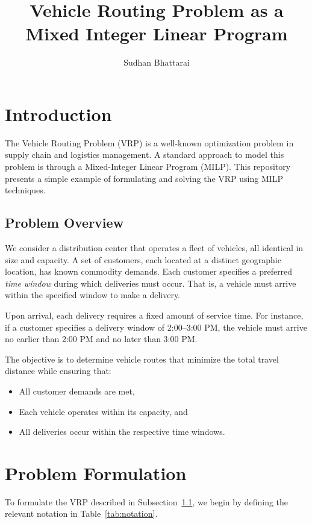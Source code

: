 \documentclass[11pt]{article}
\title{Vehicle Routing Problem as a Mixed Integer Linear Program}
\author{Sudhan Bhattarai}
\date{}
\begin{document}
\maketitle
\section{Introduction} \label{sec:introduction}
The Vehicle Routing Problem (VRP) is a well-known optimization problem in supply chain and logistics management. A standard approach to model this problem is through a Mixed-Integer Linear Program (MILP). This repository presents a simple example of formulating and solving the VRP using MILP techniques.

\subsection{Problem Overview} \label{sec:overview}
We consider a distribution center that operates a fleet of vehicles, all identical in size and capacity. A set of customers, each located at a distinct geographic location, has known commodity demands. Each customer specifies a preferred \emph{time window} during which deliveries must occur. That is, a vehicle must arrive within the specified window to make a delivery.

Upon arrival, each delivery requires a fixed amount of service time. For instance, if a customer specifies a delivery window of 2:00–3:00 PM, the vehicle must arrive no earlier than 2:00 PM and no later than 3:00 PM.

The objective is to determine vehicle routes that minimize the total travel distance while ensuring that:
\begin{itemize}
    \item All customer demands are met,
    \item Each vehicle operates within its capacity, and
    \item All deliveries occur within the respective time windows.
\end{itemize}

\section{Problem Formulation}

To formulate the VRP described in Subsection~\ref{sec:overview}, we begin by defining the relevant notation in Table~\ref{tab:notation}.
\end{document}
